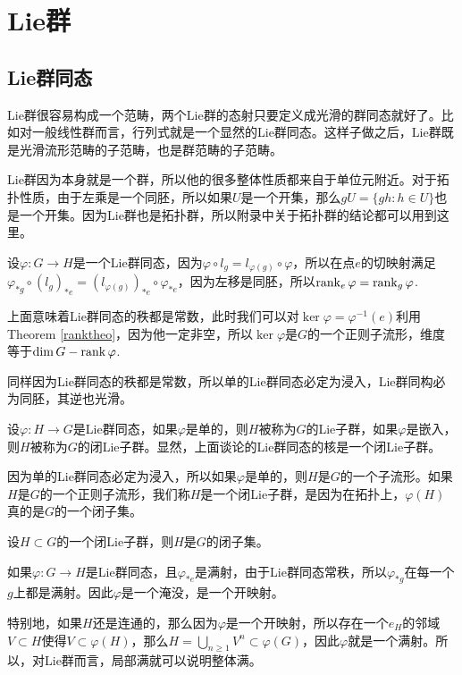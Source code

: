 \chapter{Lie群}

\section{Lie群同态}

Lie群很容易构成一个范畴，两个Lie群的态射只要定义成光滑的群同态就好了。比如对一般线性群而言，行列式就是一个显然的Lie群同态。这样子做之后，Lie群既是光滑流形范畴的子范畴，也是群范畴的子范畴。

Lie群因为本身就是一个群，所以他的很多整体性质都来自于单位元附近。对于拓扑性质，由于左乘是一个同胚，所以如果$U$是一个开集，那么$gU=\{gh:h\in U\}$也是一个开集。因为Lie群也是拓扑群，所以附录中关于拓扑群的结论都可以用到这里。

\para 设$\varphi:G\to H$是一个Lie群同态，因为$\varphi\circ l_g=l_{\varphi(g)}\circ \varphi$，所以在点$e$的切映射满足$\varphi_{*g}\circ (l_g)_{*e}=(l_{\varphi(g)})_{*e}\circ \varphi_{*e}$，因为左移是同胚，所以$\operatorname{rank}_e \varphi=\operatorname{rank}_g \varphi$.

上面意味着Lie群同态的秩都是常数，此时我们可以对$\ker \varphi=\varphi^{-1}(e)$利用Theorem \ref{ranktheo}，因为他一定非空，所以$\ker \varphi$是$G$的一个正则子流形，维度等于$\dim G-\operatorname{rank} \varphi$.

同样因为Lie群同态的秩都是常数，所以单的Lie群同态必定为浸入，Lie群同构必为同胚，其逆也光滑。

\para 设$\varphi:H\to G$是Lie群同态，如果$\varphi$是单的，则$H$被称为$G$的Lie子群，如果$\varphi$是嵌入，则$H$被称为$G$的闭Lie子群。显然，上面谈论的Lie群同态的核是一个闭Lie子群。

因为单的Lie群同态必定为浸入，所以如果$\varphi$是单的，则$H$是$G$的一个子流形。如果$H$是$G$的一个正则子流形，我们称$H$是一个闭Lie子群，是因为在拓扑上，$\varphi(H)$真的是$G$的一个闭子集。

\begin{pro}
设$H\subset G$的一个闭Lie子群，则$H$是$G$的闭子集。
\end{pro}

\para 如果$\varphi:G\to H$是Lie群同态，且$\varphi_{*e}$是满射，由于Lie群同态常秩，所以$\varphi_{*g}$在每一个$g$上都是满射。因此$\varphi$是一个淹没，是一个开映射。

特别地，如果$H$还是连通的，那么因为$\varphi$是一个开映射，所以存在一个$e_H$的邻域$V\subset H$使得$V\subset \varphi(H)$，那么$H=\bigcup_{n\geq 1}V^n\subset \varphi(G)$，因此$\varphi$就是一个满射。所以，对Lie群而言，局部满就可以说明整体满。

